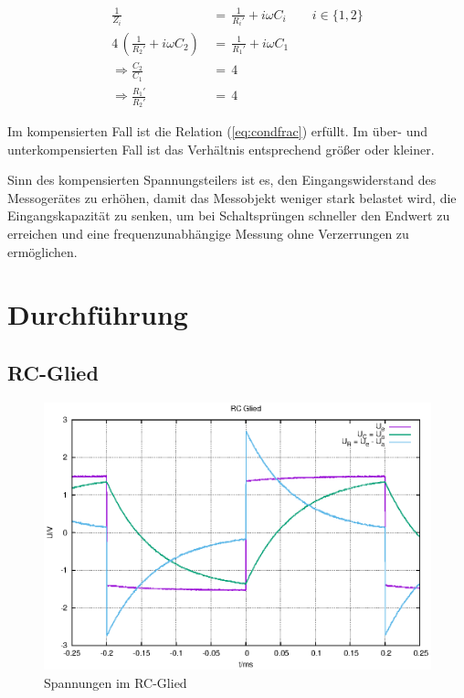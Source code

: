 \documentclass[10pt,a4paper]{scrartcl}
\begin{document}
\begin{align}
    \frac{1}{Z_i}\,&=\,\frac{1}{R_i'}+i\omega C_i\qquad i\in\{1,2\}\\
    4\,\left(\frac{1}{R_2'}+i\omega C_2\right)\,&=\,
    \frac{1}{R_1'}+i\omega C_1\\
    \label{eq:condfrac}
    \Rightarrow \frac{C_2}{C_1}\,&=\,4\\
    \Rightarrow \frac{R_1'}{R_2'}\,&=\,4
\end{align}

Im kompensierten Fall ist die Relation (\ref{eq:condfrac}) erfüllt.
Im über- und unterkompensierten Fall ist das Verhältnis entsprechend größer
oder kleiner. %

Sinn des kompensierten Spannungsteilers ist es, den Eingangswiderstand des
Messogerätes zu erhöhen, damit das Messobjekt weniger stark belastet wird,
die Eingangskapazität zu senken, um bei Schaltsprüngen schneller den Endwert
zu erreichen und eine frequenzunabhängige Messung ohne Verzerrungen zu
ermöglichen.

\section {Durchführung}

\subsection {RC-Glied}

\begin{figure}[!ht]
    \centering
    \includegraphics{graphics/CN_plot.eps}
    \caption{Spannungen im RC-Glied} \label{fig:RCplot}
\end{figure}
\end{document}
